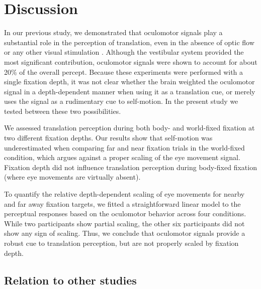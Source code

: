 

\section{Discussion}

In our previous study, we demonstrated that oculomotor signals play a substantial role in the perception of translation, even in the absence of optic flow or any other visual stimulation \cite{clemens2015a}. Although the vestibular system provided the most significant contribution, oculomotor signals were shown to account for about 20\% of the overall percept. Because these experiments were performed with a single fixation depth, it was not clear whether the brain weighted the oculomotor signal in a depth-dependent manner when using it as a translation cue, or merely uses the signal as a rudimentary cue to self-motion. In the present study we tested between these two possibilities.

We assessed translation perception during both body- and world-fixed fixation at two different fixation depths. Our results show that self-motion was underestimated when comparing far and near fixation trials in the world-fixed condition, which argues against a proper scaling of the eye movement signal. Fixation depth did not influence translation perception during body-fixed fixation (where eye movements are virtually absent).

To quantify the relative depth-dependent scaling of eye movements for nearby and far away fixation targets, we fitted a straightforward linear model to the perceptual responses based on the oculomotor behavior across four conditions. While two participants show partial scaling, the other six participants did not show any sign of scaling. Thus, we conclude that oculomotor signals provide a robust cue to translation perception, but are not properly scaled by fixation depth.


\subsection{Relation to other studies}

